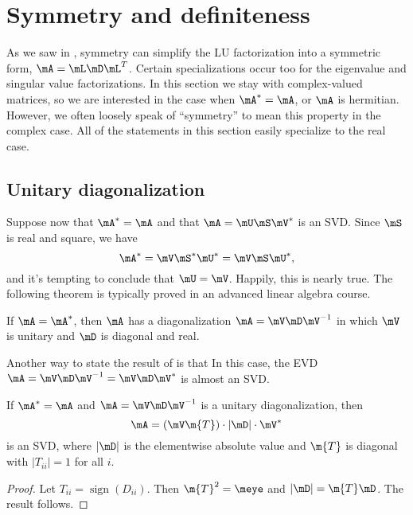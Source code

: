 
\clearpage

\section{Symmetry and definiteness}
\label{sec:symm-eig}

As we saw in , symmetry can simplify the LU factorization into a symmetric form, $\mA=\mL\mD\mL^T$. Certain specializations occur too for the eigenvalue and singular value factorizations. In this section we stay with complex-valued matrices, so we are interested in the case when $\mA^*=\mA$, or $\mA$ is hermitian. However, we often loosely speak of ``symmetry'' to mean this property in the complex case. All of the statements in this section easily specialize to the real case.

\subsection{Unitary diagonalization}

Suppose now that $\mA^*=\mA$ and that $\mA=\mU\mS\mV^*$ is an SVD. Since $\mS$ is real and square, we have
\begin{equation*}
  \mA^* = \mV \mS^* \mU^* = \mV \mS \mU^*,
\end{equation*}
and it's tempting to conclude that $\mU=\mV$. Happily, this is nearly true. The following theorem is typically proved in an advanced linear algebra course.
\begin{thm}
  \label{thm:spec-decomp} If $\mA=\mA^*$, then $\mA$ has a diagonalization $\mA=\mV \mD \mV^{-1}$ in which $\mV$ is unitary and $\mD$ is diagonal and real.
\end{thm}
Another way to state the result of  is that  In this case, the EVD $\mA=\mV\mD\mV^{-1}=\mV \mD \mV^*$ is almost an SVD.
\begin{thm}
  If $\mA^*=\mA$ and $\mA=\mV\mD\mV^{-1}$ is a  unitary diagonalization, then
  \begin{equation}
    \label{eq:herm-svd}
    \mA = (\mV\m{T})\cdot |\mD|\cdot \mV^*
  \end{equation}
  is an SVD, where $|\mD|$ is the elementwise absolute value and $\m{T}$ is diagonal with $|T_{ii}|=1$ for all $i$.
\end{thm}
\begin{proof}
  Let $T_{ii}=\operatorname{sign}(D_{ii})$. Then $\m{T}^2=\meye$ and $|\mD|=\m{T}\mD$. The result follows.
\end{proof}

